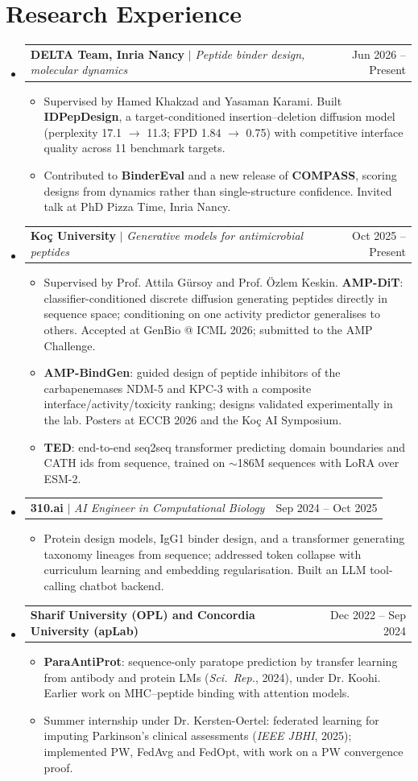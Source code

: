 \documentclass[letterpaper,10pt]{article}
\makeatletter
\newcommand{\resumeItem}[1]{\item\small{#1\vspace{-3pt}}}
\newcommand{\resumeProjectHeading}[2]{
    \item
    \begin{tabular*}{0.97\textwidth}{l@{\extracolsep{\fill}}r}
      \small#1 & #2 \\
    \end{tabular*}\vspace{-8pt}
}
\newcommand{\resumeSubHeadingListStart}{\begin{itemize}[leftmargin=0.15in, label={}]}
\newcommand{\resumeSubHeadingListEnd}{\end{itemize}}
\newcommand{\resumeItemListStart}{\begin{itemize}[topsep=1pt, itemsep=0pt, parsep=0pt]}
\newcommand{\resumeItemListEnd}{\end{itemize}\vspace{-6pt}}
\makeatother
\begin{document}
\section{Research Experience}
    \resumeSubHeadingListStart
        \resumeProjectHeading
        {\textbf{DELTA Team, Inria Nancy} $|$ \footnotesize\emph{Peptide binder design, molecular dynamics}}{Jun 2026 -- Present}
        \resumeItemListStart
            \resumeItem{Supervised by Hamed Khakzad and Yasaman Karami. Built \textbf{IDPepDesign}, a target-conditioned insertion--deletion diffusion model (perplexity 17.1 $\rightarrow$ 11.3; FPD 1.84 $\rightarrow$ 0.75) with competitive interface quality across 11 benchmark targets.}
            \resumeItem{Contributed to \textbf{BinderEval} and a new release of \textbf{COMPASS}, scoring designs from dynamics rather than single-structure confidence. Invited talk at PhD Pizza Time, Inria Nancy.}
        \resumeItemListEnd

        \resumeProjectHeading
        {\textbf{Ko\c{c} University} $|$ \footnotesize\emph{Generative models for antimicrobial peptides}}{Oct 2025 -- Present}
        \resumeItemListStart
            \resumeItem{Supervised by Prof. Attila G\"{u}rsoy and Prof. \"{O}zlem Keskin. \textbf{AMP-DiT}: classifier-conditioned discrete diffusion generating peptides directly in sequence space; conditioning on one activity predictor generalises to others. Accepted at GenBio @ ICML 2026; submitted to the AMP Challenge.}
            \resumeItem{\textbf{AMP-BindGen}: guided design of peptide inhibitors of the carbapenemases NDM-5 and KPC-3 with a composite interface/activity/toxicity ranking; designs validated experimentally in the lab. Posters at ECCB 2026 and the Ko\c{c} AI Symposium.}
            \resumeItem{\textbf{TED}: end-to-end seq2seq transformer predicting domain boundaries and CATH ids from sequence, trained on $\sim$186M sequences with LoRA over ESM-2.}
        \resumeItemListEnd

        \resumeProjectHeading
        {\textbf{310.ai} $|$ \footnotesize\emph{AI Engineer in Computational Biology}}{Sep 2024 -- Oct 2025}
        \resumeItemListStart
            \resumeItem{Protein design models, IgG1 binder design, and a transformer generating taxonomy lineages from sequence; addressed token collapse with curriculum learning and embedding regularisation. Built an LLM tool-calling chatbot backend.}
        \resumeItemListEnd

        \resumeProjectHeading
        {\textbf{Sharif University (OPL) and Concordia University (apLab)}}{Dec 2022 -- Sep 2024}
        \resumeItemListStart
            \resumeItem{\textbf{ParaAntiProt}: sequence-only paratope prediction by transfer learning from antibody and protein LMs (\emph{Sci.\ Rep.}, 2024), under Dr. Koohi. Earlier work on MHC--peptide binding with attention models.}
            \resumeItem{Summer internship under Dr. Kersten-Oertel: federated learning for imputing Parkinson's clinical assessments (\emph{IEEE JBHI}, 2025); implemented PW, FedAvg and FedOpt, with work on a PW convergence proof.}
        \resumeItemListEnd
    \resumeSubHeadingListEnd
\end{document}
